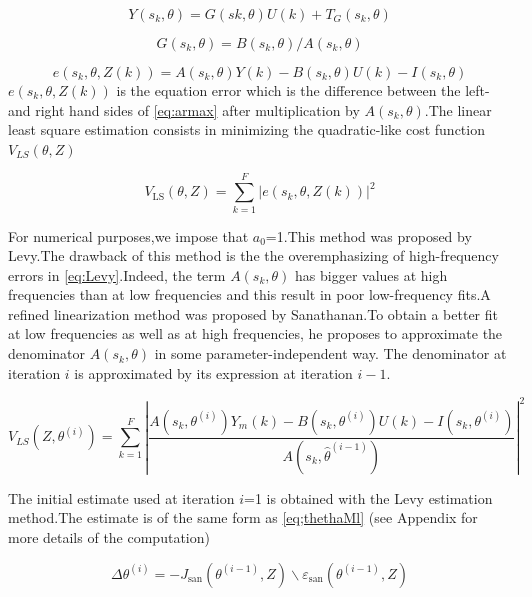 \documentclass[a4paper,12pt]{article}
\numberwithin{equation}{section}
\begin{document}
\begin{equation}\label{eq:armax}
Y\left(s_{k}, \theta\right)=G\left(s{k}, \theta\right) U(k) + T_{G}\left(s_{k}, \theta\right)
\end{equation}

$$
G(s_{k}, \theta)=B(s_{k}, \theta) / A(s_{k}, \theta)
$$

$$
e\left(s_{k}, \theta, Z(k)\right)=A\left(s_{k}, \theta\right) Y(k)-B\left(s_{k}, \theta\right) U(k)- I\left(s_{k}, \theta\right)
$$
\noindent
$e\left(s_{k}, \theta, Z(k)\right)$ is the equation error  which is the difference between the left- and right hand sides of \ref{eq:armax}  after multiplication by $A\left(s_{k}, \theta\right)$.The linear least square estimation consists in minimizing the  quadratic-like cost function $V_{LS}(\theta
, Z)$

\begin{equation}\label{eq:Levy}
V_{\mathrm{LS}}(\theta, Z)=\sum_{k=1}^{F}\left|e\left(s_{k}, \theta, Z(k)\right)\right|^{2}
\end{equation}

\noindent
For numerical purposes,we impose that $a_{0}$=1.This method was proposed by Levy.The drawback of this method is the the overemphasizing of high-frequency errors in \ref{eq:Levy}.Indeed, the term $A\left(s_{k}, \theta\right)$ has bigger values at high frequencies than at low frequencies and this result in poor low-frequency fits.A refined linearization method was proposed by Sanathanan.To obtain a better fit at low frequencies as well as at
high frequencies, he proposes to approximate the denominator $A\left(s_{k}, \theta\right)$ in some parameter-independent way. The denominator at iteration $i$ is approximated by its expression at iteration $i-1$.

\begin{equation}
V_{LS}\left(Z, \theta^{(i)}\right)=\sum_{k=1}^{F}\left|\frac{A\left(s_{k}, \theta^{(i)}\right) Y_{m}(k)-B\left(s_{k}, \theta^{(i)}\right) U(k)-I\left(s_{k}, \theta^{(i)}\right)}{A\left(s_{k}, \hat{\theta}^{(i-1)}\right)}\right|^{2}
\end{equation}

\noindent
The initial estimate used at iteration $i$=1 is obtained with the Levy estimation method.The estimate is of the same form as \ref{eq;thethaMl} (see Appendix for more details of the computation)

\begin{equation}\label{eq:ThethaSanathanan}
\Delta \theta^{(i)}=-J_{\mathrm{san}}\left(\theta^{(i-1)}, Z\right) \backslash \varepsilon_{\mathrm{san}}\left(\theta^{(i-1)}, Z\right)
\end{equation}
\end{document}
